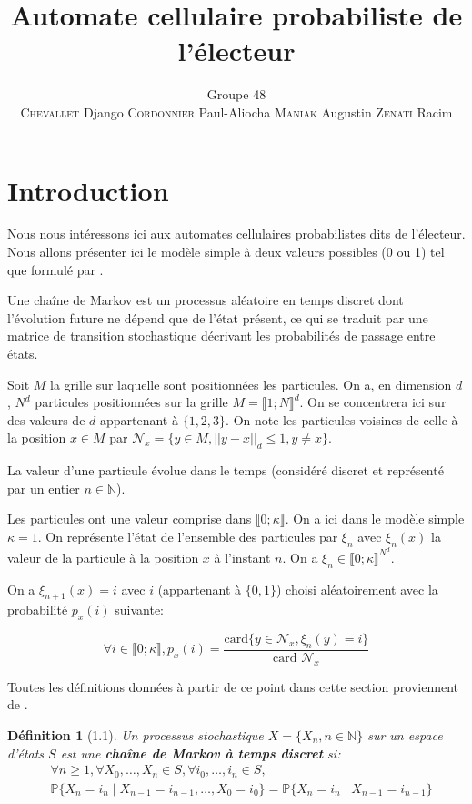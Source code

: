 \documentclass[11pt,a4paper]{article}
\title{Automate cellulaire probabiliste de l'électeur}
\author{%
Groupe 48 \\
\textsc{Chevallet} Django\;
\textsc{Cordonnier} Paul-Aliocha\;
\textsc{Maniak} Augustin\;
\textsc{Zenati} Racim
}
\newtheorem*{definition}{Définition}
\begin{document}
\maketitle

\section{Introduction}

Nous nous intéressons ici aux automates cellulaires probabilistes dits
de l'électeur. Nous allons présenter ici le modèle
simple à deux valeurs possibles (0 ou 1) tel que formulé par
\cite{holley1975}.

Une chaîne de Markov est un processus aléatoire en temps discret dont 
l’évolution future ne dépend que de l’état présent, ce qui se traduit
par une matrice de transition stochastique décrivant les probabilités de 
passage entre états.

Soit $M$ la grille sur laquelle sont positionnées les particules. On a,
en dimension $d$, $N^d$ particules positionnées sur la grille $M =
\llbracket 1;N \rrbracket^d$. On se concentrera ici sur des valeurs de
$d$ appartenant à $\{1, 2, 3\}$. On note les particules voisines de
celle à la position $x \in M$ par $\mathcal{N}_x = \{ y \in M, ||y -
x||_d \leq 1, y \not= x\}$.

La valeur d'une particule évolue dans le temps (considéré discret et
représenté par un entier $n \in \mathbb{N}$).

Les particules ont une valeur comprise dans $\llbracket 0; \kappa
\rrbracket$. On a ici dans le modèle simple $\kappa = 1$. On
représente l'état de l'ensemble des particules par $\xi_n$ avec
$\xi_n(x)$ la valeur de la particule à la position $x$ à l'instant
$n$. On a $\xi_n \in \llbracket 0; \kappa\rrbracket^{N^d}$.

On a $\xi_{n + 1}(x) = i$ avec $i$ (appartenant à $\{0,1\}$)
choisi aléatoirement avec la
probabilité $p_x(i)$ suivante:

\[
\forall i \in \llbracket 0; \kappa\rrbracket, p_x(i) = \frac{\text{card}
  \{ y \in \mathcal{N}_x, \xi_n(y) = i \}}{\text{card }\mathcal{N}_x}
\]

Toutes les définitions données à partir de ce point dans cette section
proviennent de \cite{sericola2013}.

\begin{definition}[1.1]
    Un processus stochastique $X = \{X_n, n \in \mathbb{N}\}$ sur un espace d'états $S$ est une \textbf{chaîne de Markov à temps discret} si:
    \begin{equation*}
      \begin{split}
        &\forall n \geq 1,
        \forall X_0, \ldots, X_n \in S,
        \forall i_0, \ldots, i_n \in S, \\
        &\mathbb{P}\{X_n = i_n \mid X_{n-1} = i_{n-1}, \dots, X_0 =
        i_0\} = \mathbb{P}\{X_n = i_n \mid X_{n-1} = i_{n-1}\}
      \end{split}
    \end{equation*}
\end{definition}
\end{document}
